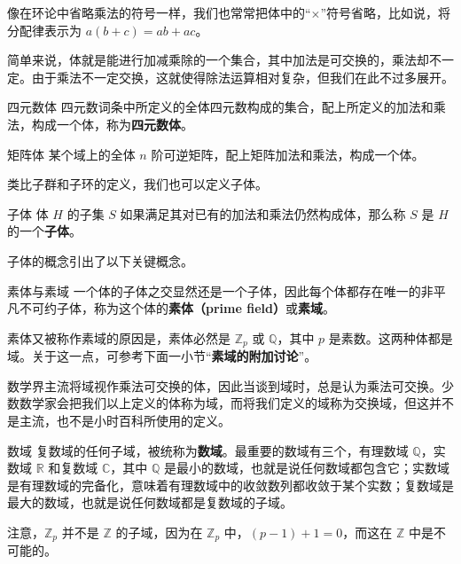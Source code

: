 像在环论中省略乘法的符号一样，我们也常常把体中的“$\times$”符号省略，比如说，将分配律表示为 $a(b+c)=ab+ac$。

简单来说，体就是能进行加减乘除的一个集合，其中加法是可交换的，乘法却不一定。由于乘法不一定交换，这就使得除法运算相对复杂，但我们在此不过多展开。

\begin{example}{四元数体}
四元数词条中所定义的全体四元数构成的集合，配上所定义的加法和乘法，构成一个体，称为\textbf{四元数体}。
\end{example}

\begin{example}{矩阵体}
某个域上的全体 $n$ 阶可逆矩阵，配上矩阵加法和乘法，构成一个体。
\end{example}

类比子群和子环的定义，我们也可以定义子体。

\begin{definition}{子体}
体 $H$ 的子集 $S$ 如果满足其对已有的加法和乘法仍然构成体，那么称 $S$ 是 $H$ 的一个\textbf{子体}。
\end{definition}
子体的概念引出了以下关键概念。
\begin{definition}{素体与素域}
一个体的子体之交显然还是一个子体，因此每个体都存在唯一的非平凡不可约子体，称为这个体的\textbf{素体（prime field）}或\textbf{素域}。
\end{definition}

素体又被称作素域的原因是，素体必然是 $\mathbb{Z}_p$ 或 $\mathbb{Q}$，其中 $p$ 是素数。这两种体都是域。关于这一点，可参考下面一小节“\textbf{素域的附加讨论}”。




数学界主流将域视作乘法可交换的体，因此当谈到域时，总是认为乘法可交换。少数数学家会把我们以上定义的体称为域，而将我们定义的域称为交换域，但这并不是主流，也不是小时百科所使用的定义。

\begin{example}{数域}
复数域的任何子域，被统称为\textbf{数域}。最重要的数域有三个，有理数域 $\mathbb{Q}$，实数域 $\mathbb{R}$ 和复数域 $\mathbb{C}$，其中 $\mathbb{Q}$ 是最小的数域，也就是说任何数域都包含它；实数域是有理数域的完备化，意味着有理数域中的收敛数列都收敛于某个实数；复数域是最大的数域，也就是说任何数域都是复数域的子域。

注意，$\mathbb{Z}_p$ 并不是 $\mathbb{Z}$ 的子域，因为在 $\mathbb{Z}_p$ 中，$(p-1)+1=0$，而这在 $\mathbb{Z}$ 中是不可能的。
\end{example}

